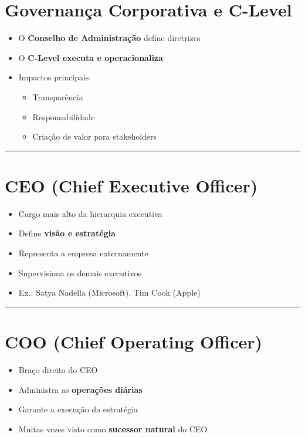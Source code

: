 \documentclass[
]{book}
\providecommand{\tightlist}{%
  \setlength{\itemsep}{0pt}\setlength{\parskip}{0pt}}
\begin{document}
\section{Governança Corporativa e C-Level}\label{governanuxe7a-corporativa-e-c-level}

\begin{itemize}
\tightlist
\item
  O \textbf{Conselho de Administração} define diretrizes
\item
  O \textbf{C-Level executa e operacionaliza}
\item
  Impactos principais:

  \begin{itemize}
  \tightlist
  \item
    Transparência
  \item
    Responsabilidade
  \item
    Criação de valor para stakeholders
  \end{itemize}
\end{itemize}

\begin{center}\rule{0.5\linewidth}{0.5pt}\end{center}

\section{CEO (Chief Executive Officer)}\label{ceo-chief-executive-officer}

\begin{itemize}
\tightlist
\item
  Cargo mais alto da hierarquia executiva
\item
  Define \textbf{visão e estratégia}
\item
  Representa a empresa externamente
\item
  Supervisiona os demais executivos
\item
  Ex.: Satya Nadella (Microsoft), Tim Cook (Apple)
\end{itemize}

\begin{center}\rule{0.5\linewidth}{0.5pt}\end{center}

\section{COO (Chief Operating Officer)}\label{coo-chief-operating-officer}

\begin{itemize}
\tightlist
\item
  Braço direito do CEO
\item
  Administra as \textbf{operações diárias}
\item
  Garante a execução da estratégia
\item
  Muitas vezes visto como \textbf{sucessor natural} do CEO
\end{itemize}
\end{document}
